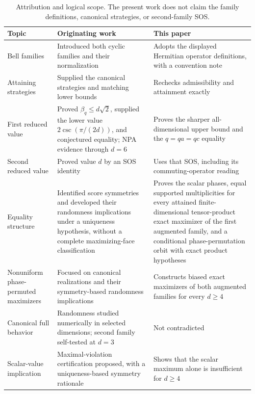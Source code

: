 \documentclass[11pt]{article}
\theoremstyle{definition}
\theoremstyle{remark}
\begin{document}
\begin{table}[t]
\centering
\small
\begin{tabularx}{\textwidth}{@{}>{\raggedright\arraybackslash}p{}
>{\raggedright\arraybackslash}X>{\raggedright\arraybackslash}X@{}}
\toprule
Topic & Originating work \cite{PeritoEtAl2026} & This paper\\
\midrule
Bell families & Introduced both cyclic families and their normalization &
Adopts the displayed Hermitian operator definitions, with a convention note\\
Attaining strategies & Supplied the canonical strategies and matching lower
bounds & Rechecks admissibility and attainment exactly\\
First reduced value & Proved \(\beta_q\leq d\sqrt2\), supplied the lower
value \(2\csc(\pi/(2d))\), and conjectured equality; NPA evidence through
\(d=6\) & Proves the sharper all-dimensional upper bound and the
\(q=qa=qc\) equality\\
Second reduced value & Proved value \(d\) by an SOS identity & Uses that SOS,
including its commuting-operator reading\\
Equality structure & Identified score symmetries and developed their
randomness implications under a uniqueness hypothesis, without a complete
maximizing-face classification & Proves the scalar phases, equal supported
multiplicities for every attained finite-dimensional tensor-product exact
maximizer of the first augmented family, and a conditional phase-permutation
orbit with exact product hypotheses\\
Nonuniform phase-permuted maximizers & Focused on canonical realizations and
their symmetry-based randomness implications & Constructs biased exact
maximizers of both augmented families for every \(d\geq4\)\\
Canonical full behavior & Randomness studied numerically in selected
dimensions; second family self-tested at \(d=3\) & Not contradicted\\
Scalar-value implication & Maximal-violation certification proposed, with a
uniqueness-based symmetry rationale & Shows that the scalar maximum alone is
insufficient for \(d\geq4\)\\
\bottomrule
\end{tabularx}
\caption{Attribution and logical scope.  The present work does not claim the
family definitions, canonical strategies, or second-family SOS.}
\label{tab:contributions}
\end{table}
\end{document}
